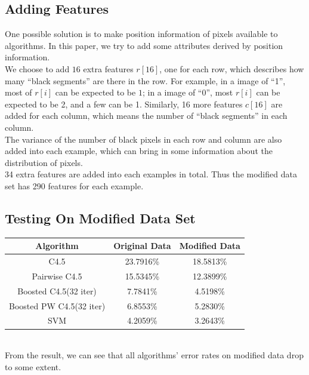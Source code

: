 \documentclass[a4paper,11pt]{article}
\begin{document}
\subsection{Adding Features}
One possible solution is to make position information of pixels available to algorithms. In this paper, we try to add some attributes derived by position information.\\
We choose to add $16$ extra features $r[16]$, one for each row, which describes how many ``black segments'' are there in the row. For example, in a image of ``1'', most of $r[i]$ can be expected to be $1$; in a image of ``0'', most $r[i]$ can be expected to be 2, and a few can be 1. Similarly, 16 more features $c[16]$ are added for each column, which means the number of ``black segments'' in each column.\\
The variance of the number of black pixels in each row and column are also added into each example, which can bring in some information about the distribution of pixels.\\
34 extra features are added into each examples in total. Thus the modified data set has 290 features for each example.
\subsection{Testing On Modified Data Set}
\vspace{0.5cm}
\begin{tabular}{c c c}
Algorithm		&	Original Data	&Modified Data\\
\hline \hline
C4.5                            &23.7916\%		& 18.5813\%\\
Pairwise C4.5                   &15.5345\%      & 12.3899\%\\
Boosted C4.5(32 iter)	        &7.7841\%		& 4.5198\%\\
Boosted PW C4.5(32 iter)	    &6.8553\%       & 5.2830\%\\
SVM                         	&4.2059\%       & 3.2643\%\\
\end{tabular}
\vspace{0.5cm}\\
From the result, we can see that all algorithms' error rates on modified data drop to some extent.\\
\end{document}
